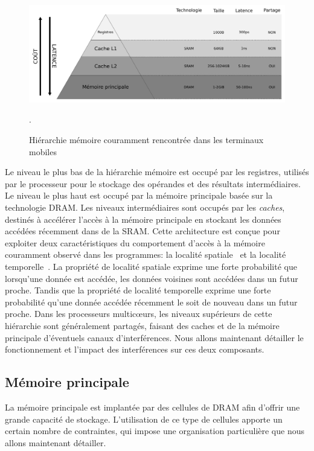 \begin{figure}[!h]
	\includegraphics[width=\linewidth]{graphics/figures/hierarchie.pdf}
	\caption{\label{fig:hierarchie_memoire} Hiérarchie mémoire couramment rencontrée dans les terminaux mobiles}.
\end{figure}

Le niveau le plus bas de la hiérarchie mémoire est occupé par les registres, utilisés par le processeur pour le stockage des opérandes et des résultats intermédiaires.
Le niveau le plus haut est occupé par la mémoire principale basée sur la technologie DRAM.
Les niveaux intermédiaires sont occupés par les \emph{caches}, destinés à accélérer l'accès à la mémoire principale en stockant les données accédées récemment dans de la SRAM.
Cette architecture est conçue pour exploiter deux caractéristiques du comportement d'accès à la mémoire couramment observé dans les programmes: la localité spatiale~\cite{liptay1968structural} et la localité temporelle~\cite{wilkes1965slave}.
La propriété de localité spatiale exprime une forte probabilité que lorsqu'une donnée est accédée, les données voisines sont accédées dans un futur proche.
Tandis que la propriété de localité temporelle exprime une forte probabilité qu'une donnée accédée récemment le soit de nouveau dans un futur proche.
Dans les processeurs multicœurs, les niveaux supérieurs de cette hiérarchie sont généralement partagés, faisant des caches et de la mémoire principale d'éventuels canaux d'interférences.
Nous allons maintenant détailler le fonctionnement et l'impact des interférences sur ces deux composants.

\subsection{Mémoire principale}

La mémoire principale est implantée par des cellules de DRAM afin d'offrir une grande capacité de stockage.
L'utilisation de ce type de cellules apporte un certain nombre de contraintes, qui impose une organisation particulière que nous allons maintenant détailler.

